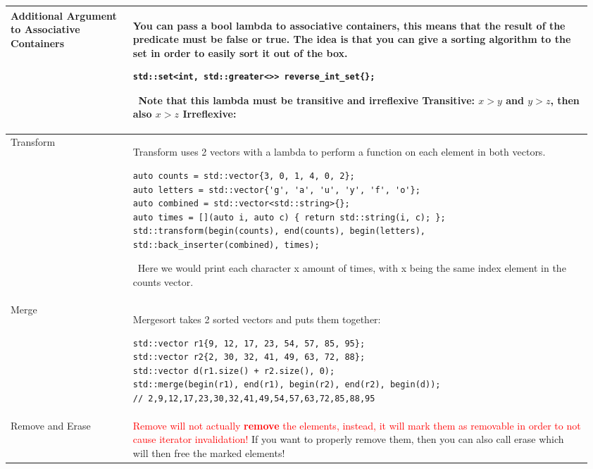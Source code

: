 \documentclass[main.tex,fontsize=8pt,paper=a4,paper=portrait,DIV=calc,]{scrartcl}
\begin{document}
\begin{table}[ht!]
\begin{tabular}{|m{0.2\linewidth}|m{0.755\linewidth}|}
\hline
Additional Argument to Associative Containers & 
You can pass a bool lambda to associative containers, this means that the result of the predicate must be false or true.\newline
The idea is that you can give a sorting algorithm to the set in order to easily sort it out of the box.\newline
\begin{lstlisting}
std::set<int, std::greater<>> reverse_int_set{};
\end{lstlisting} 
\, \newline
\textcolor{OliveGreen}{Note that this lambda must be \textbf{transitive and irreflexive}}\newline
Transitive: \(x > y\) and \(y > z\), then also \(x > z\)\newline
Irreflexive: \\
\hline
Transform & 
Transform uses 2 vectors with a lambda to perform a function on each element in both vectors.\newline
\begin{lstlisting}
auto counts = std::vector{3, 0, 1, 4, 0, 2};
auto letters = std::vector{'g', 'a', 'u', 'y', 'f', 'o'};
auto combined = std::vector<std::string>{};
auto times = [](auto i, auto c) { return std::string(i, c); };
std::transform(begin(counts), end(counts), begin(letters),
std::back_inserter(combined), times);
\end{lstlisting}
\, \newline
Here we would print each character x amount of times, with x being the same index element in the counts vector.\\
\hline
Merge & 
Mergesort takes 2 sorted vectors and puts them together:\newline
\begin{lstlisting}
std::vector r1{9, 12, 17, 23, 54, 57, 85, 95};
std::vector r2{2, 30, 32, 41, 49, 63, 72, 88};
std::vector d(r1.size() + r2.size(), 0);
std::merge(begin(r1), end(r1), begin(r2), end(r2), begin(d));
// 2,9,12,17,23,30,32,41,49,54,57,63,72,85,88,95
\end{lstlisting}\\
\hline
Remove and Erase & 
\textcolor{red}{Remove will not actually \textbf{remove} the elements, instead, it will mark them as removable in order to not cause iterator invalidation!}\newline
\textcolor{OliveGreen}{If you want to properly remove them, then you can also call erase which will then free the marked elements!}\newline

\end{tabular}
\end{table}
\end{document}
